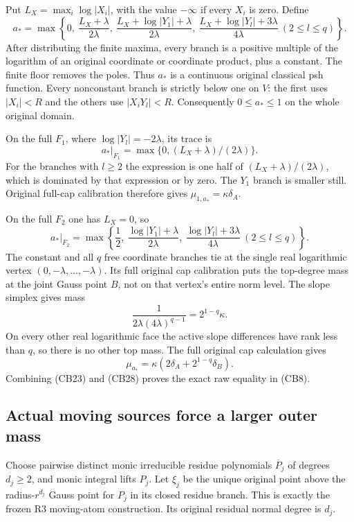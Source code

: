 Put $L_X=\max_i\log|X_i|$, with the value $-\infty$ if every
$X_i$ is zero. Define
\[
 a_*=\max\left\{
 0,\ \frac{L_X+\lambda}{2\lambda},\
 \frac{L_X+\log|Y_1|+\lambda}{2\lambda},\
 \frac{L_X+\log|Y_l|+3\lambda}{4\lambda}\ (2\le l\le q)
                \right\}.
 \tag{CB24}
\]
After distributing the finite maxima, every branch is a positive
multiple of the logarithm of an original coordinate or coordinate
product, plus a constant. The finite floor removes the poles.
Thus $a_*$ is a continuous original classical psh function.
Every nonconstant branch is strictly below one on $V$:
the first uses $|X_i|<R$ and the others use $|X_iY_l|<R$.
Consequently $0\le a_*\le1$ on the whole original domain.

On the full $F_1$, where $\log|Y_l|=-2\lambda$, its trace is
\[
                    a_*|_{F_1}
                        =\max\{0,(L_X+\lambda)/(2\lambda)\}.
 \tag{CB25}
\]
For the branches with $l\ge2$ the expression is one half of
$(L_X+\lambda)/(2\lambda)$, which is dominated by that
expression or by zero. The $Y_1$ branch is smaller still.
Original full-cap calibration therefore gives
$\mu_{1,a_*}=\kappa\delta_A$.

On the full $F_2$ one has $L_X=0$, so
\[
 a_*|_{F_2}=
 \max\left\{\frac12,\
       \frac{\log|Y_1|+\lambda}{2\lambda},\
       \frac{\log|Y_l|+3\lambda}{4\lambda}\ (2\le l\le q)
       \right\}.
 \tag{CB26}
\]
The constant and all $q$ free coordinate branches tie at the
single real logarithmic vertex $(0,-\lambda,\ldots,-\lambda)$.
Its full original cap calibration puts the top-degree mass at
the joint Gauss point $B$, not on that vertex's entire norm level.
The slope simplex gives mass
\[
       \frac1{2\lambda(4\lambda)^{q-1}}
                          =2^{1-q}\kappa.
 \tag{CB27}
\]
On every other real logarithmic face the active slope differences
have rank less than $q$, so there is no other top mass. The full
original cap calculation gives
\[
               \mu_{a_*}
                  =\kappa(2\delta_A+2^{1-q}\delta_B).
 \tag{CB28}
\]
Combining (CB23) and (CB28) proves the exact raw equality in
(CB8).

\subsection{Actual moving sources force a larger outer mass}

Choose pairwise distinct monic irreducible residue polynomials
$\overline P_j$ of degrees $d_j\ge2$, and monic integral lifts
$P_j$. Let $\xi_j$ be the unique original point above the
radius-$r^{d_j}$ Gauss point for $P_j$ in its closed residue
branch. This is exactly the frozen R3 moving-atom construction.
Its original residual normal degree is $d_j$.

